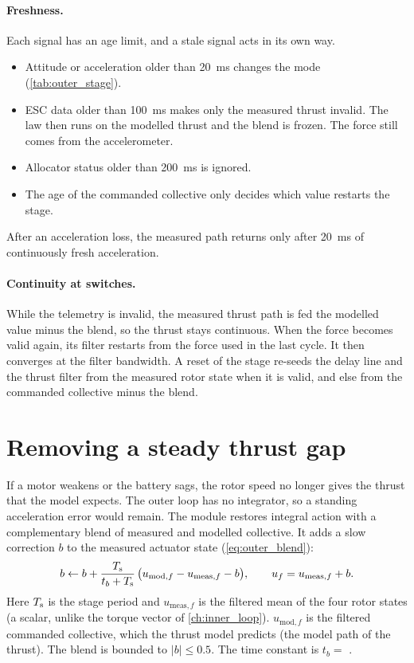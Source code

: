 \paragraph{Freshness.}
Each signal has an age limit, and a stale signal acts in its own way.
\begin{itemize}
  \item Attitude or acceleration older than 20~ms changes the mode (\cref{tab:outer_stage}).
  \item ESC data older than 100~ms makes only the measured thrust invalid. The law then runs on the modelled thrust and the blend is frozen. The force still comes from the accelerometer.
  \item Allocator status older than 200~ms is ignored.
  \item The age of the commanded collective only decides which value restarts the stage.
\end{itemize}
After an acceleration loss, the measured path returns only after 20~ms of continuously fresh acceleration.

\paragraph{Continuity at switches.}
While the telemetry is invalid, the measured thrust path is fed the modelled value minus the blend, so the thrust stays continuous.
When the force becomes valid again, its filter restarts from the force used in the last cycle.
It then converges at the filter bandwidth.
A reset of the stage re-seeds the delay line and the thrust filter from the measured rotor state when it is valid, and else from the commanded collective minus the blend.

\section{Removing a steady thrust gap}\label{sec:outer_gap}

If a motor weakens or the battery sags, the rotor speed no longer gives the thrust that the model expects.
The outer loop has no integrator, so a standing acceleration error would remain.
The module restores integral action with a complementary blend of measured and modelled collective.
It adds a slow correction $b$ to the measured actuator state (\cref{eq:outer_blend}):
\begin{equation}\label{eq:outer_blend}
  b \leftarrow b + \frac{T_{\mathrm{s}}}{t_b + T_{\mathrm{s}}}\,\bigl(u_{\mathrm{mod},f} - u_{\mathrm{meas},f} - b\bigr),
  \qquad u_f = u_{\mathrm{meas},f} + b .
\end{equation}
Here $T_{\mathrm{s}}$ is the stage period and $u_{\mathrm{meas},f}$ is the filtered mean of the four rotor states (a scalar, unlike the torque vector of \cref{ch:inner_loop}).
$u_{\mathrm{mod},f}$ is the filtered commanded collective, which the thrust model predicts (the model path of the thrust).
The blend is bounded to $\lvert b\rvert \le 0.5$.
The time constant is $t_b = $ .

